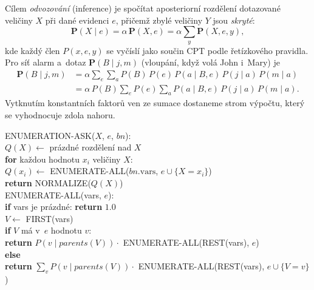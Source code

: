 Cílem \emph{odvozování} (inference) je spočítat aposteriorní rozdělení dotazované veličiny $X$ při dané evidenci $e$, přičemž zbylé veličiny $Y$ jsou \emph{skryté}:
\[ \mathbf{P}(X\mid e)=\alpha\,\mathbf{P}(X,e)=\alpha\sum_{y}\mathbf{P}(X,e,y), \]
kde každý člen $P(x,e,y)$ se vyčíslí jako součin CPT podle řetízkového pravidla. Pro síť alarm a~dotaz $\mathbf{P}(B\mid j,m)$ (vloupání, když volá John i~Mary) je
\begin{align*}
\mathbf{P}(B\mid j,m)&=\alpha\sum_{e}\sum_{a} P(B)\,P(e)\,P(a\mid B,e)\,P(j\mid a)\,P(m\mid a)\\
&=\alpha\,P(B)\sum_{e}P(e)\sum_{a}P(a\mid B,e)\,P(j\mid a)\,P(m\mid a).
\end{align*}
Vytknutím konstantních faktorů ven ze sumace dostaneme strom výpočtu, který se vyhodnocuje zdola nahoru.

\begin{algo}
\ttfamily\small
ENUMERATION-ASK($X$, $e$, $bn$):\\
\hspace*{1.5em}$Q(X)\leftarrow$ prázdné rozdělení nad $X$\\
\hspace*{1.5em}\textbf{for} každou hodnotu $x_i$ veličiny $X$:\\
\hspace*{3em}$Q(x_i)\leftarrow$ ENUMERATE-ALL($bn.\mathrm{vars}$, $e\cup\{X{=}x_i\}$)\\
\hspace*{1.5em}\textbf{return} NORMALIZE($Q(X)$)\\[2pt]
ENUMERATE-ALL(vars, $e$):\\
\hspace*{1.5em}\textbf{if} vars je prázdné: \textbf{return} $1.0$\\
\hspace*{1.5em}$V\leftarrow$ FIRST(vars) \\
\hspace*{1.5em}\textbf{if} $V$ má v~$e$ hodnotu $v$:\\
\hspace*{3em}\textbf{return} $P(v\mid \mathit{parents}(V))\cdot$ ENUMERATE-ALL(REST(vars), $e$)\\
\hspace*{1.5em}\textbf{else} \\
\hspace*{3em}\textbf{return} $\sum_{v} P(v\mid \mathit{parents}(V))\cdot$ ENUMERATE-ALL(REST(vars), $e\cup\{V{=}v\}$)
\end{algo}

